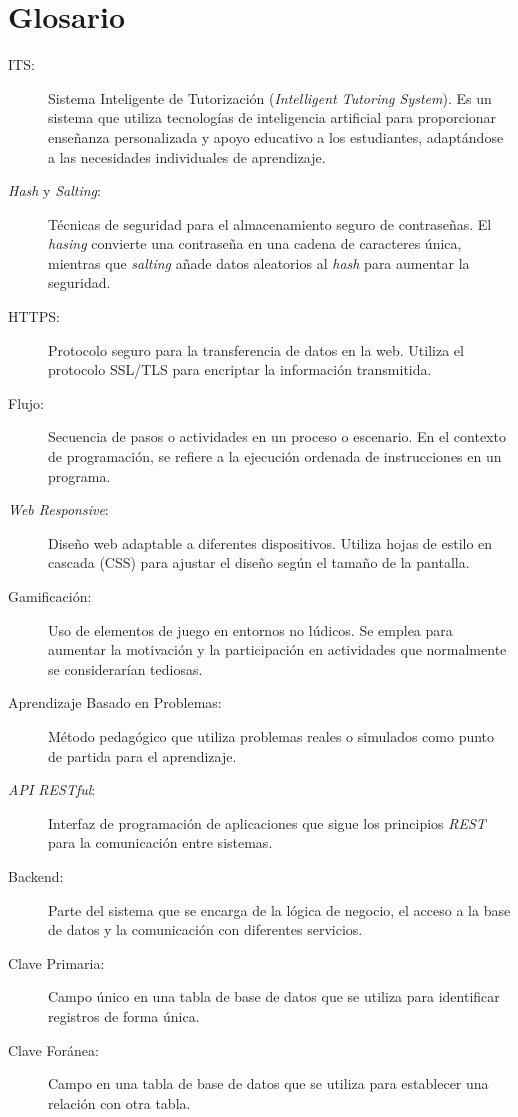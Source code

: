 \section*{Glosario} \label{glosario}

\begin{description}
    \item[ITS:] Sistema Inteligente de Tutorización (\textit{Intelligent Tutoring System}). Es un sistema que utiliza tecnologías de inteligencia artificial para proporcionar enseñanza personalizada y apoyo educativo a los estudiantes, adaptándose a las necesidades individuales de aprendizaje.
    \item[\textit{Hash} y \textit{Salting}:] Técnicas de seguridad para el almacenamiento seguro de contraseñas. El \textit{hasing} convierte una contraseña en una cadena de caracteres única, mientras que \textit{salting} añade datos aleatorios al \textit{hash} para aumentar la seguridad.
    \item[HTTPS:] Protocolo seguro para la transferencia de datos en la web. Utiliza el protocolo SSL/TLS para encriptar la información transmitida.
    \item[Flujo:] Secuencia de pasos o actividades en un proceso o escenario. En el contexto de programación, se refiere a la ejecución ordenada de instrucciones en un programa.
    \item[\textit{Web Responsive}:] Diseño web adaptable a diferentes dispositivos. Utiliza hojas de estilo en cascada (CSS) para ajustar el diseño según el tamaño de la pantalla.
    \item[Gamificación:] Uso de elementos de juego en entornos no lúdicos. Se emplea para aumentar la motivación y la participación en actividades que normalmente se considerarían tediosas.
    \item[Aprendizaje Basado en Problemas:] Método pedagógico que utiliza problemas reales o simulados como punto de partida para el aprendizaje.
    \item[\textit{API RESTful}:] Interfaz de programación de aplicaciones que sigue los principios \textit{REST} para la comunicación entre sistemas.
    \item[Backend:] Parte del sistema que se encarga de la lógica de negocio, el acceso a la base de datos y la comunicación con diferentes servicios.
    \item[Clave Primaria:] Campo único en una tabla de base de datos que se utiliza para identificar registros de forma única.
    \item[Clave Foránea:] Campo en una tabla de base de datos que se utiliza para establecer una relación con otra tabla.

\end{description}
